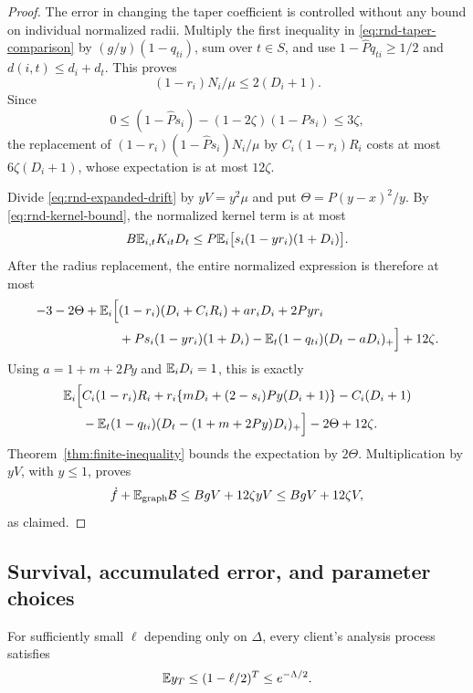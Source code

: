 \begin{proof}
The error in changing the taper coefficient is controlled without
any bound on individual normalized radii.  Multiply the first
inequality in \eqref{eq:rnd-taper-comparison} by
$(g/y)(1-q_{ti})$, sum over $t\in S$, and use
$1-\widehat Pq_{ti}\ge1/2$ and $d(i,t)\le d_i+d_t$.  This proves
\begin{equation}\label{eq:rnd-radius-error-control}
 (1-r_i)N_i/\mu\le2(D_i+1).
\end{equation}
Since
\[
 0\le(1-\widehat Ps_i)-(1-2\zeta)(1-Ps_i)\le3\zeta,
\]
the replacement of
$(1-r_i)(1-\widehat Ps_i)N_i/\mu$ by
$C_i(1-r_i)R_i$ costs at most $6\zeta(D_i+1)$, whose expectation
is at most $12\zeta$.

Divide \eqref{eq:rnd-expanded-drift} by $yV=y^2\mu$ and put
$\Theta=P(y-x)^2/y$.  By \eqref{eq:rnd-kernel-bound}, the normalized
kernel term is at most
\[
 B\mathbb E_{i,t}K_{it}D_t
 \le P\mathbb E_i\bigl[s_i(1-yr_i)(1+D_i)\bigr].
\]
After the radius replacement, the entire normalized expression is
therefore at most
\begin{align*}
 -3-2\Theta+\mathbb E_i\Big[&
 (1-r_i)(D_i+C_iR_i)+ar_iD_i+2Pyr_i\\
 &+Ps_i(1-yr_i)(1+D_i)
 -\mathbb E_t(1-q_{ti})(D_t-aD_i)_+\Big]+12\zeta.
\end{align*}
Using $a=1+m+2Py$ and $\mathbb E_iD_i=1$, this is exactly
\begin{align*}
 \mathbb E_i\Big[&C_i(1-r_i)R_i
 +r_i\{mD_i+(2-s_i)Py(D_i+1)\}-C_i(D_i+1)\\
 &-\mathbb E_t(1-q_{ti})(D_t-(1+m+2Py)D_i)_+\Big]
 -2\Theta+12\zeta.
\end{align*}
Theorem~\ref{thm:finite-inequality} bounds the expectation by
$2\Theta$.  Multiplication by $yV$, with $y\le1$, proves
\[
 \dot f+\mathbb E_{\mathrm{graph}}\mathcal B
 \le BgV+12\zeta yV\le BgV+12\zeta V,
\]
as claimed.
\end{proof}

\subsection{Survival, accumulated error, and parameter choices}

\begin{lemma}\label{lem:rnd-survival}
For sufficiently small $\ell$ depending only on $\Delta$, every
client's analysis process satisfies
\begin{equation}\label{eq:rnd-survival}
 \mathbb E y_T\le(1-\ell/2)^T\le e^{-\Lambda/2}.
\end{equation}
\end{lemma}

